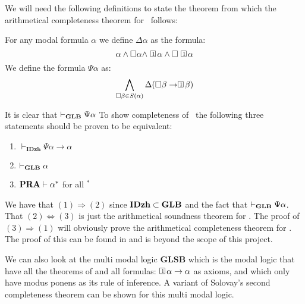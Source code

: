 \documentclass[../main.tex]{subfiles}
\begin{document}
We will need the following definitions to state the theorem from which the
arithmetical completeness theorem for \GLB\ follows:
\begin{defi}
	For any modal formula $\alpha$ we define $\Delta\alpha$ as the formula:
	\[\alpha\wedge\Box\alpha\wedge\OneBox\alpha\wedge\Box\OneBox\alpha\]
	We define the formula $\Psi\alpha$ as:
	\[\bigwedge_{\Box\beta\in
	S(\alpha)}\Delta(\Box\beta\rightarrow\OneBox\beta)\]
\end{defi}
It is clear that $\vdash_{\text{\textbf{GLB}}}\Psi\alpha$
To show completeness of \GLB\ the following three statements should be proven to
be equivalent:
\begin{enumerate}
	\item $\vdash_{\textbf{IDzh}}\Psi\alpha\rightarrow\alpha$
	\item $\vdash_{\text{\textbf{GLB}}}\alpha$
	\item $\text{\textbf{PRA}}\vdash\alpha^*$ for all $^*$
\end{enumerate}
We have that $(1)\Rightarrow (2)$ since $\text{\textbf{IDzh}}\subset\text{\textbf{GLB}}$ and the fact that
$\vdash_{\text{\textbf{GLB}}}\Psi\alpha$. That $(2)\Leftrightarrow(3)$ is just the arithmetical
soundness theorem for \GLB. The proof of $(3)\Rightarrow(1)$ will obviously
prove the arithmetical completeness theorem for \GLB.
The proof of this can be found in \parencite{Boolos1993} and is beyond the scope of
this project.

We can also look at the multi modal logic \textbf{GLSB} which is the modal logic that have all
the theorems of \GLB  and all formulas:
$\OneBox\alpha\rightarrow\alpha$ as axioms, and which only have modus ponens as
its rule of inference. A variant of Solovay's second completeness theorem can
be shown for this multi modal logic.
\end{document}
